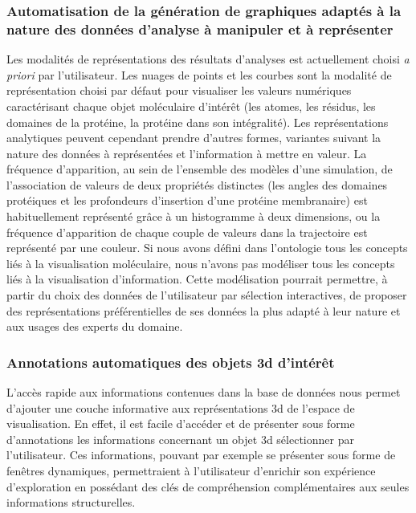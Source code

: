 \subsubsection*{Automatisation de la génération de graphiques adaptés à la nature des données d'analyse à manipuler et à représenter}

Les modalités de représentations des résultats d'analyses est actuellement choisi \textit{a priori} par l'utilisateur. Les nuages de points et les courbes sont la modalité de représentation choisi par défaut pour visualiser les valeurs numériques caractérisant chaque objet moléculaire d'intérêt (les atomes, les résidus, les domaines de la protéine, la protéine dans son intégralité). Les représentations analytiques peuvent cependant prendre d'autres formes, variantes suivant la nature des données à représentées et l'information à mettre en valeur.  La fréquence d'apparition, au sein de l'ensemble des modèles d'une simulation, de l'association de valeurs de deux propriétés distinctes (les angles des domaines protéiques et les profondeurs d'insertion d'une protéine membranaire) est habituellement représenté grâce à un histogramme à deux dimensions, ou la fréquence d'apparition de chaque couple de valeurs dans la trajectoire est représenté par une couleur. Si nous avons défini dans l'ontologie tous les concepts liés à la visualisation moléculaire, nous n'avons pas modéliser tous les concepts liés à la visualisation d'information. Cette modélisation pourrait permettre, à partir du choix des données de l'utilisateur par sélection interactives, de proposer des représentations préférentielles de ses données la plus adapté à leur nature et aux usages des experts du domaine.

\subsubsection*{Annotations automatiques des objets 3d d'intérêt}

L'accès rapide aux informations contenues dans la base de données nous permet d'ajouter une couche informative aux représentations 3d de l'espace de visualisation. En effet, il est facile d'accéder et de présenter sous forme d'annotations les informations concernant un objet 3d sélectionner par l'utilisateur. Ces informations, pouvant par exemple se présenter sous forme de fenêtres dynamiques, permettraient à l'utilisateur d'enrichir son expérience d'exploration en possédant des clés de compréhension complémentaires aux seules informations structurelles.

